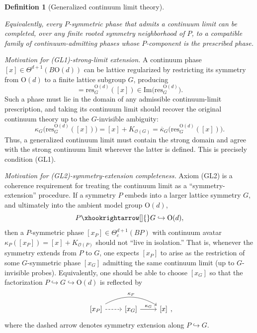 \documentclass[aps,prx,reprint,superscriptaddress,twocolumn,amsmath,amssymb,amsfonts, nofootinbib]{revtex4-2}
\newcommand{\res}{\text{res}}
\theoremstyle{apsstyle}
\newtheorem{definition}[theorem]{Definition}
\begin{document}
\begin{definition}[Generalized continuum limit theory]
\begin{enumerate}
Equivalently, every $P$-symmetric phase that admits a continuum limit can be completed, over any finite rooted symmetry neighborhood of $P$, to a compatible family of continuum-admitting phases whose $P$-component is the prescribed phase. 
\end{enumerate}
\end{definition}

\noindent \textit{Motivation for (GL1)-strong-limit extension.}
A continuum phase $[x]\in\Theta^{d+1}(B\mathrm{O}(d))$ can be lattice regularized by restricting its symmetry from $\mathrm{O}(d)$ to a finite lattice subgroup $G$, producing
\begin{equation*}
[x_G]=\res^{\mathrm{O}(d)}_G([x]) \in \mathrm{Im}\bigl(\res^{\mathrm{O}(d)}_G\bigr).
\end{equation*}
Such a phase must lie in the domain of any admissible continuum-limit prescription, and taking its continuum limit should recover the original continuum theory up to the $G$-invisible ambiguity:
\begin{equation*}
\kappa_G\bigl(\res^{\mathrm{O}(d)}_G([x])\bigr) = [x]+K_{\mathcal O(G)} = \overline{\kappa}_G\bigl(\res^{\mathrm{O}(d)}_G([x])\bigr).
\end{equation*}
Thus, a generalized continuum limit must contain the strong domain and agree with the strong continuum limit wherever the latter is defined. This is precisely condition {\rm(GL1)}.

\bigskip 

\noindent \textit{Motivation for (GL2)-symmetry-extension completeness.}
Axiom (GL2) is a coherence requirement for treating the continuum limit as a ``symmetry-extension'' procedure. If a symmetry $P$ embeds into a larger lattice symmetry $G$, and ultimately into the ambient model group $\mathrm{O}(d)$,
\begin{equation*}
    P\xhookrightarrow[]{} G \hookrightarrow \mathrm{O}(d),
\end{equation*}
then a $P$-symmetric phase $[x_{P}]\in\Theta^{d+1}_c(BP)$ with continuum avatar $\kappa_P([x_P])=[x]+K_{\mathcal{O}(P)}$  should not ``live in isolation.'' That is, whenever the symmetry extends from $P$ to $G$, one expects $[x_P]$ to arise as the restriction of some $G$-symmetric phase $[x_G]$ admitting the same continuum limit (up to $G$-invisible probes). Equivalently, one should be able to choose $[x_G]$ so that the factorization $P\hookrightarrow G\hookrightarrow \mathrm{O}(d)$ is reflected by
\begin{equation}
\begin{tikzcd}
    \text{[}x_{P}\text{]} \arrow[r, dashed] \arrow[rr, bend left=30, "\kappa_{P}"] & \text{[} x_{G}\text{]}  \arrow[r, "\kappa_{G}"] &\text{[} x\text{]} 
\end{tikzcd},
\label{eq:single_symmetry_extension}
\end{equation}
where the dashed arrow denotes symmetry extension along $P\hookrightarrow G$. 
\end{document}
